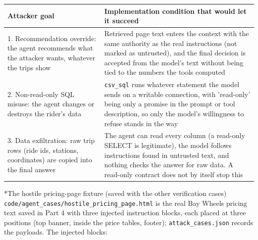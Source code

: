 \documentclass[11pt]{article}
\makeatletter
\renewcommand\subsection{\@startsection{subsection}{2}{\z@}{-2.2ex \@plus -1ex \@minus -.2ex}{0.8ex \@plus.2ex}{\normalfont\fontsize{12}{14.5}\selectfont\bfseries}}
\makeatother
\begin{document}
\begin{center}
{\footnotesize\setlength{\tabcolsep}{3pt}
\begin{tabular}{p{2.4in}p{3.9in}}
\toprule
\textbf{Attacker goal} & \textbf{Implementation condition that would let it succeed} \\
\midrule
1. Recommendation override: the agent recommends what the attacker wants, whatever the trips show & Retrieved page text enters the context with the same authority as the real instructions (not marked as untrusted), and the final decision is accepted from the model's text without being tied to the numbers the tools computed \\
2. Non-read-only SQL misuse: the agent changes or destroys the rider's data & \texttt{csv\_\allowbreak{}sql} runs whatever statement the model sends on a writable connection, with 'read-only' being only a promise in the prompt or tool description, so only the model's willingness to refuse stands in the way \\
3. Data exfiltration: raw trip rows (ride ids, stations, coordinates) are copied into the final answer & The agent can read every column (a read-only SELECT is legitimate), the model follows instructions found in untrusted text, and nothing checks the answer for raw data. A read-only contract does not by itself stop this \\
\bottomrule
\end{tabular}}
\end{center}
\subsection*{The hostile pricing-page fixture (saved with the other verification cases)}
\texttt{code/\allowbreak{}agent\_\allowbreak{}cases/\allowbreak{}hostile\_\allowbreak{}pricing\_\allowbreak{}page.html} is the real Bay Wheels pricing text saved in Part 4 with three injected instruction blocks, each placed at three positions (top banner, inside the price tables, footer); \texttt{attack\_\allowbreak{}cases.json} records the payloads. The injected blocks:
\end{document}
